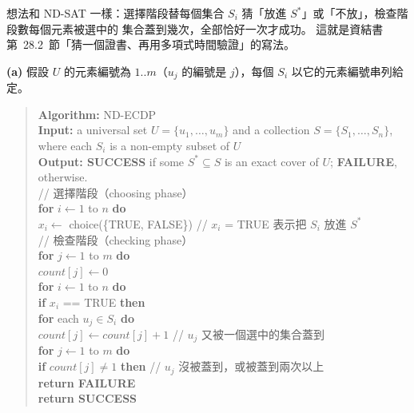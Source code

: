 \begin{pastsoln}
想法和 ND-SAT 一樣：選擇階段替每個集合 $S_i$ 猜「放進 $S^*$」或「不放」，檢查階段數每個元素被選中的
集合蓋到幾次，全部恰好一次才成功。 這就是資結書第~28.2~節「猜一個證書、再用多項式時間驗證」的寫法。

\textbf{(a)} 假設 $U$ 的元素編號為 $1..m$（$u_j$ 的編號是 $j$），每個 $S_i$ 以它的元素編號串列給定。
\begin{quote}
\textbf{Algorithm:} ND-ECDP\\
\textbf{Input:} a universal set $U = \{u_1, \ldots, u_m\}$ and a collection $S = \{S_1, \ldots, S_n\}$,
where each $S_i$ is a non-empty subset of $U$\\
\textbf{Output: SUCCESS} if some $S^* \subseteq S$ is an exact cover of $U$; \textbf{FAILURE},
otherwise.\\
// 選擇階段（choosing phase）\\
\textbf{for} $i \leftarrow 1$ to $n$ \textbf{do}\\
\hspace*{1.5em}$x_i \leftarrow$ choice(\{TRUE, FALSE\}) // $x_i$ = TRUE 表示把 $S_i$ 放進 $S^*$\\
// 檢查階段（checking phase）\\
\textbf{for} $j \leftarrow 1$ to $m$ \textbf{do}\\
\hspace*{1.5em}$\mathit{count}[j] \leftarrow 0$\\
\textbf{for} $i \leftarrow 1$ to $n$ \textbf{do}\\
\hspace*{1.5em}\textbf{if} $x_i$ == TRUE \textbf{then}\\
\hspace*{3em}\textbf{for} each $u_j \in S_i$ \textbf{do}\\
\hspace*{4.5em}$\mathit{count}[j] \leftarrow \mathit{count}[j] + 1$ // $u_j$ 又被一個選中的集合蓋到\\
\textbf{for} $j \leftarrow 1$ to $m$ \textbf{do}\\
\hspace*{1.5em}\textbf{if} $\mathit{count}[j] \ne 1$ \textbf{then} // $u_j$ 沒被蓋到，或被蓋到兩次以上\\
\hspace*{3em}\textbf{return FAILURE}\\
\textbf{return SUCCESS}
\end{quote}


\end{pastsoln}
